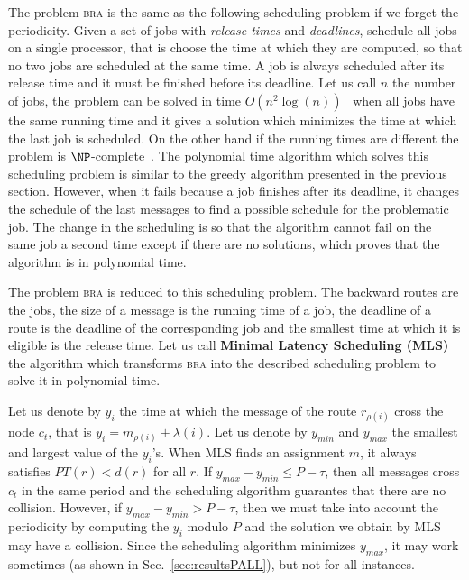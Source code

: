 \documentclass[a4paper,10pt]{article}
\newcommand\bra{\textsc{bra}\xspace}
\begin{document}
     
     The problem \bra is the same as the following scheduling problem if we forget the periodicity. Given a set of jobs with \emph{release times} and  \emph{deadlines}, schedule all jobs on a single processor, that is choose the time at which they are computed, so that no two jobs are scheduled at the same time. A job is always scheduled after its release time and it must be finished before its deadline. Let us call $n$ the number of jobs, the problem can be solved in time $O(n^2\log(n))$~\cite{simons1978fast} when all jobs have the same running time and it gives a solution which minimizes the time at which the last job is scheduled. On the other hand if the running times are different the problem is $\NP$-complete~\cite{lenstra1977complexity}. 
     The  polynomial time algorithm  which solves this scheduling problem is similar to the greedy algorithm presented in the previous section. However, when it fails because a job finishes after its deadline, it changes the schedule of the last messages to find a possible schedule for the problematic job. The change in the scheduling is so that the algorithm cannot fail on the same job a second time except if there are no solutions, which proves that the algorithm is in polynomial time.
     
     The problem \bra is reduced to this scheduling problem. The backward routes are the jobs, the size of a message is the running time of a job, the deadline of a route is the deadline of the corresponding job and the smallest time at which it is eligible is the release time. Let us call {\bf Minimal Latency Scheduling (MLS)} the algorithm which transforms \bra into the described scheduling problem to solve it in polynomial time.
     
     Let us denote by $y_i$ the time at which the message of the route $r_{\rho(i)}$ cross the node $c_t$,
     that is $y_i = m_{\rho(i)} + \lambda(i)$. Let us denote by $y_{min}$ and $y_{max}$ the smallest and largest value of the $y_i$'s. When MLS finds an assignment $m$, it always satisfies $PT(r) < d(r)$ for all $r$. If $y_{max}- y_{min} \leq P -\tau $, then all messages cross $c_t$ in the same period and 
     the scheduling algorithm guarantes that there are no collision. However, if $y_{max}- y_{min} > P -\tau $, then we must take into account the periodicity by computing the $y_i$ modulo $P$ and the solution we obtain by MLS may have a collision. Since the scheduling algorithm minimizes $y_{max}$, it may work sometimes (as shown in Sec.~\ref{sec:resultsPALL}), but not for all instances. 
     
\end{document}
